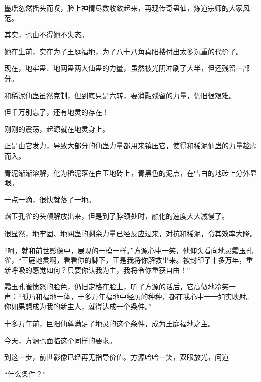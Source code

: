 \begin{this_body}
墨瑶忽然摇头而叹，脸上神情尽数收敛起来，再现传奇蛊仙，炼道宗师的大家风范。

其实，也由不得她不失态。

她在生前，实在为了王庭福地，为了八十八角真阳楼付出太多沉重的代价了。

现在，地牢蛊、地网蛊两大仙蛊的力量，虽然被光阴冲刷了大半，但还残留一部分。

和稀泥仙蛊虽然克制，但到底只是六转，要消融残留的力量，仍旧很艰难。

但千万别忘了，还有地灵的存在！

刚刚的震荡，起源就在地灵身上。

正是由它发力，导致大部分的仙蛊力量都用来镇压它，使得和稀泥仙蛊的力量趁虚而入。

青泥渐渐溶解，化为稀泥落在白玉地砖上，青黑色的泥点，在雪白的地砖上分外显眼。

一点一滴，很快就落了一地。

霜玉孔雀的头颅解放出来，但是到了脖颈处时，融化的速度大大减慢了。

很显然，地牢固、地网蛊的剩余力量已经反应过来，对抗和稀泥，令其效率大降。

“呵，就和前世影像中，展现的一模一样。”方源心中一笑，他仰头看向地灵霜玉孔雀，“王庭地灵啊，看看你的脚下，正是我将你解救出来。被封印了十多万年，重新呼吸的感觉如何？只要你认我为主，我将令你重获自由！”

霜玉孔雀愤怒的脸色，仍旧定格在脸上，听了方源的话后，它高傲地冷笑一声：“孤乃和福地一体，十多万年福地中经历的种种，都在我心中一一如实映射。你如果想成为我的新主人，就得达成一个条件。”

十多万年前，巨阳仙尊满足了地灵的这个条件，成为王庭福地之主。

今天，方源也面临这个同样的要求。

到这一步，前世影像已经再无指导价值。方源哈哈一笑，双眼放光，问道――

“什么条件？”

\end{this_body}

